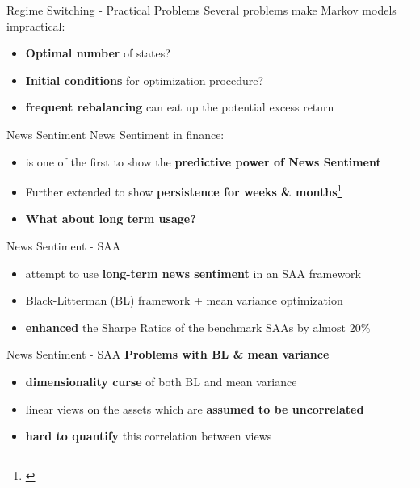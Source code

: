 \begin{frame}{Regime Switching - Practical Problems}
 Several problems make Markov models impractical:
\begin{itemize}
    \item \textbf{Optimal number} of states? 
    \item \textbf{Initial conditions} for optimization procedure?
    \item \textbf{frequent rebalancing} can eat up the potential excess return
\end{itemize}
\end{frame}

\begin{frame}{News Sentiment}
News Sentiment in finance:
\begin{itemize}
    \item \cite{tetlock2007giving} is one of the first to show the \textbf{predictive power of News Sentiment}
    \item Further extended to show \textbf{persistence for weeks \& months}\footnote{\citet{uhl2015s}}
    \item \textbf{What about long term usage?}
\end{itemize}
\end{frame}


\begin{frame}{News Sentiment - SAA}
\begin{itemize}
    \item \citet{enhPortOpti} attempt to use \textbf{long-term news sentiment} in an SAA framework
    \item  Black-Litterman (BL) framework + mean variance optimization
    \item \textbf{enhanced} the Sharpe Ratios of the benchmark SAAs by almost 20\%
\end{itemize}
\end{frame}


\begin{frame}{News Sentiment - SAA}
\textbf{Problems with BL \& mean variance}
\begin{itemize}
    \item \textbf{dimensionality curse} of both BL and mean variance
    \item linear views on the assets which are \textbf{assumed to be uncorrelated}
    \item \textbf{hard to quantify} this correlation between views
\end{itemize}
\end{frame}

